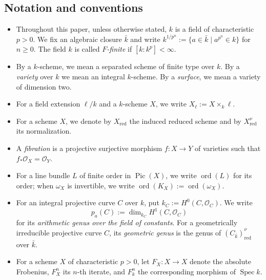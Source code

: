 \documentclass[10pt,abstract=true]{scrartcl}
\numberwithin{equation}{section}
\theoremstyle{definition}
\theoremstyle{remark}
\DeclareMathOperator\Pic{Pic}
\DeclareMathOperator\ord{ord}
\begin{document}
\subsection{Notation and conventions}\label{sec:notation-conventions}
\begin{itemize}
  \item Throughout this paper, unless otherwise stated, $k$ is a field of characteristic $p>0$.
    We fix an algebraic closure $\bar k$ and write $k^{1/p^n}:=\{a\in\bar k\mid a^{p^n}\in k\}$ for $n\geq0$.
    The field $k$ is called \emph{$F$-finite} if $[k:k^p]<\infty$.
  \item By a $k$-scheme, we mean a separated scheme of finite type over $k$.
    By a \emph{variety} over $k$ we mean an integral $k$-scheme.
    By a \textit{surface}, we mean a variety of dimension two.

  \item For a field extension $\ell/k$ and a $k$-scheme $X$, we write $X_\ell:=X\times_k\ell$.
  \item For a scheme $X$, we denote by $X_{\mathrm{red}}$ the induced reduced scheme and by $X_{\mathrm{red}}^\nu$ its normalization.
  \item A \emph{fibration} is a projective surjective morphism $f\colon X\to Y$ of varieties such that $f_*\mathcal O_X=\mathcal O_Y$.
  \item For a line bundle $L$ of finite order in $\Pic(X)$, we write $\ord(L)$ for its order; when $\omega_X$ is invertible, we write $\ord(K_X):=\ord(\omega_X)$.
  \item For an integral projective curve $C$ over $k$, put $k_C := H^0(C,\mathcal O_C)$.
    We write
    \[
      p_a(C) := \dim_{k_C}H^1(C,\mathcal O_C)
    \]
    for its \emph{arithmetic genus over the field of constants}.
    For a geometrically irreducible projective curve $C$, its \emph{geometric genus} is the genus of $(C_{\bar k})_{\mathrm{red}}^\nu$ over $\bar k$.

  \item For a scheme $X$ of characteristic $p>0$, let $F_X\colon X\to X$ denote the absolute Frobenius, $F_X^n$ its $n$-th iterate, and $F_k^n$ the corresponding morphism of $\operatorname{Spec}k$.


\end{itemize}
\end{document}
